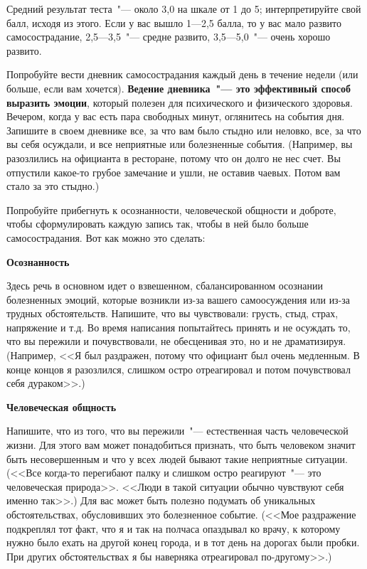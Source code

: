 \vspace{3ex}

Средний результат теста~"--- около 3,0 на шкале от 1 до 5; интерпретируйте свой балл, исходя из этого. 
Если у вас вышло 1---2,5 балла, то у вас мало развито самосострадание, 2,5---3,5~"--- средне развито, 3,5---5,0~"--- очень хорошо развито.



Попробуйте вести дневник самосострадания каждый день в течение недели (или больше, если вам хочется). \textbf{Ведение дневника~"--- это эффективный способ выразить эмоции}, который полезен для психического и физического здоровья.
Вечером, когда у вас есть пара свободных минут, оглянитесь на события дня. Запишите в своем дневнике все, за что вам было стыдно или неловко, все, за что вы себя осуждали, и все неприятные или болезненные события. (Например, вы разозлились на официанта в ресторане, потому что он долго не нес счет. Вы отпустили какое-то грубое замечание и ушли, не оставив чаевых. Потом вам стало за это стыдно.)

Попробуйте прибегнуть к осознанности, человеческой общности и доброте, чтобы сформулировать каждую запись так, чтобы в ней было больше самосострадания. Вот как можно это сделать:
\vspace{3ex}

\textbf{Осознанность}

Здесь речь в основном идет о взвешенном, сбалансированном осознании болезненных эмоций, которые возникли из-за вашего самоосуждения или из-за трудных обстоятельств. Напишите, что вы чувствовали: грусть, стыд, страх, напряжение и т.д. Во время написания попытайтесь принять и не осуждать то, что вы пережили и почувствовали, не обесценивая это, но и не драматизируя. (Например, <<Я был раздражен, потому что официант был очень медленным. В конце концов я разозлился, слишком остро отреагировал и потом почувствовал себя дураком>>.) 
\vspace{3ex}

\textbf{Человеческая общность}

Напишите, что из того, что вы пережили~"--- естественная часть человеческой жизни. Для этого вам может понадобиться признать, что быть человеком значит быть несовершенным и что у всех людей бывают такие неприятные ситуации. (<<Все когда-то перегибают палку и слишком остро реагируют~"--- это человеческая природа>>. <<Люди в такой ситуации обычно чувствуют себя именно так>>.) Для вас может быть полезно подумать об уникальных обстоятельствах, обусловивших это болезненное событие. (<<Мое раздражение подкреплял тот факт, что я и так на полчаса опаздывал ко врачу, к которому нужно было ехать на другой конец города, и в тот день на дорогах были пробки. При других обстоятельствах я бы наверняка отреагировал по-другому>>.) 
\vspace{3ex}

